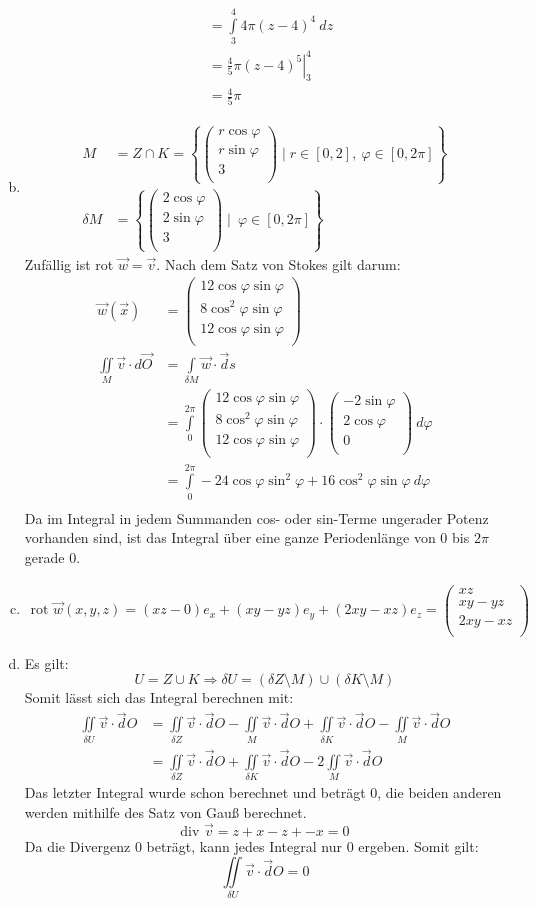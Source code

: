 \documentclass[10pt,a4paper,parskip=half]{scrartcl}
\newcommand{\vecthree}[3]{\begin{pmatrix}#1\\#2\\#3\\\end {pmatrix}}
\begin{document}
\begin{enumerate}[(a)]
\begin{align*}
                &= \int\limits_{3}^4 4\pi(z-4)^4   ~ dz \\
                &= \left. \frac 45 \pi (z-4)^5 \right|^4_3    \\
                &= \frac 45 \pi
      \end{align*}
    \item 
    \begin{align*}
        M &= Z \cap K = \left\{ \vecthree{r \cos \varphi}{r\sin \varphi}{3} \mid r \in [0,2] ,~ \varphi \in [0,2\pi] \right\}  \\
        \delta M &=  \left\{ \vecthree{2 \cos \varphi}{2\sin \varphi}{3} \mid ~ \varphi \in [0,2\pi] \right\} 
    \end{align*}
    Zufällig ist rot $\vec w = \vec v$.
    Nach dem Satz von Stokes gilt darum:\\
    \begin{align*}
        \vec w(\vec x) &= \vecthree{12\cos \varphi \sin \varphi}{8\cos^2 \varphi \sin \varphi}{12\cos \varphi \sin \varphi} \\
        \iint\limits_M \vec v \cdot d\vec O  &= \int\limits_{\delta M} \vec w  \cdot \vec ds \\
        &= \int\limits_{0}^{2\pi} \vecthree{12\cos \varphi \sin \varphi}{8\cos^2 \varphi \sin \varphi}{12\cos \varphi \sin \varphi}  \cdot  \vecthree{-2\sin \varphi}{2\cos \varphi}{0} ~ d\varphi \\
        &= \int\limits_{0}^{2\pi} -24\cos \varphi \sin^2 \varphi + 16 \cos^2 \varphi \sin \varphi~ d\varphi \\
    \end{align*}
    Da im Integral in jedem Summanden cos- oder sin-Terme ungerader Potenz vorhanden sind, ist das Integral über eine ganze Periodenlänge von $0$ bis $2\pi$ gerade 0.
    \item 
    \begin{align*}
      \text{rot } \vec w(x,y,z)  = \left( xz - 0 \right)e_x + \left( xy - yz \right)e_y + \left( 2xy - xz \right)e_z = \vecthree{xz}{xy -yz}{2xy - xz}
    \end{align*}
    \item Es gilt:
    \[ U = Z \cup K \Rightarrow \delta U = (\delta Z \setminus M) \cup (\delta K \setminus M)  \]
    Somit lässt sich das Integral berechnen mit:
    \begin{align*}
      \iint\limits_{\delta U} \vec v \cdot \vec dO &= \iint\limits_{\delta Z} \vec v \cdot \vec dO - \iint\limits_{M } \vec v \cdot \vec dO + \iint\limits_{\delta K} \vec v \cdot \vec dO - \iint\limits_{M } \vec v \cdot \vec dO\\ 
      &= \iint\limits_{\delta Z} \vec v \cdot \vec dO  + \iint\limits_{\delta K} \vec v \cdot \vec dO - 2\iint\limits_{M } \vec v \cdot \vec dO
    \end{align*}
    Das letzter Integral wurde schon berechnet und beträgt $0$, die beiden anderen werden mithilfe des Satz von Gauß berechnet.
    \[ \text{div } \vec v = z + x - z + - x = 0 \]
    Da die Divergenz 0 beträgt, kann jedes Integral nur 0 ergeben. Somit gilt:
    \[ \iint\limits_{\delta U} \vec v \cdot \vec dO = 0 \]
\end{enumerate}
\end{document}
